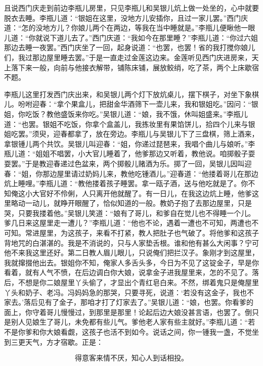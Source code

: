 且说西门庆走到前边李瓶儿房里，只见李瓶儿和吴银儿炕上做一处坐的，心中就要脱衣去睡。李瓶儿道：“银姐在这里，没地方儿安插你，且过一家儿罢。”西门庆道：“怎的没地方儿？你娘儿两个在两边，等我在当中睡就是。”李瓶儿便瞅他一眼儿道：“你就说下道儿去了。”西门庆道：“我如今在那里睡？”李瓶儿道：“你过六姐那边去睡一夜罢。”西门庆坐了一回，起身说道：“也罢，也罢！省的我打搅你娘儿们，我过那边屋里睡去罢。”于是一直走过金莲这边来。金莲听见西门庆进房来，天上落下来一般，向前与他接衣解带，铺陈床铺，展放鲛绡，吃了茶，两个上床歇宿不题。

李瓶儿这里打发西门庆出来，和吴银儿两个灯下放炕桌儿，摆下棋子，对坐下象棋儿。吩咐迎春：“拿个果盒儿，把甜金华酒筛下一壶儿来，我和银姐吃。”因问：“银姐，你吃饭？教他盛饭来你吃。”吴银儿道：“娘，我不饿，休叫姐盛来。”李瓶儿道：“也罢。银姐不吃饭，你拿个盒盖儿，我拣妆里有果馅饼儿，拾四个儿来与银姐吃罢。”须臾，迎春都拿了，放在旁边。李瓶儿与吴银儿下了三盘棋，筛上酒来，拿银锺儿两个共饮。吴银儿叫迎春：“姐，你递过琵琶来，我唱个曲儿与娘听。”李瓶儿道：“姐姐不唱罢，小大官儿睡着了，他爹那边又听着，教他说。咱掷骰子耍耍罢。”于是教迎春递过色盆来，两个掷骰儿赌酒为乐。掷了一回，吴银儿因叫迎春：“姐，你那边屋里请过奶妈儿来，教他吃锺酒儿。”迎春道：“他搂着哥儿在那边炕上睡哩。”李瓶儿道：“教他搂着孩子睡罢。拿一瓯子酒，送与他吃就是了。你不知俺这小大官好不伶俐，人只离开他就醒了。有一日儿，在我这边炕上睡，他爹这里略动一动儿，就睁开眼醒了，恰似知道的一般。教奶子抱了去那边屋里，只是哭，只要我搂着他。”吴银儿笑道：“娘有了哥儿，和爹自在觉儿也不得睡一个儿。爹几日来这屋里走一遭儿？”李瓶儿道：“他也不论，遇着一遭也不可知，两遭也不可知。常进屋里，为这孩子，来看不打紧，教人把肚子也气破了。将他爹和这孩子背地咒的白湛湛的。我是不消说的，只与人家垫舌根。谁和他有甚么大闲事？宁可他不来我这里还好。第二日教人眉儿眼儿，只说俺们把拦汉子。象刚才到这屋里，我就撺掇他出去。银姐你不知，俺家人多舌头多，今日为不见了这锭金子，早是你看着，就有人气不愤，在后边调白你大娘，说拿金子进我屋里来，怎的不见了。落后，不想是你二娘屋里丫头偷了，才显出个青红皂白来。不然，绑着鬼只是俺屋里丫头和奶子、老冯。冯妈妈急的那哭，只要寻死，说道：‘若没有这金子，我也不家去。’落后见有了金子，那咱才打了灯家去了。”吴银儿道：“娘，也罢。你看爹的面上，你守着哥儿慢慢过，到那里是那里！论起后边大娘没甚言语，也罢了。倒只是别人见娘生了哥儿，未免都有些儿气。爹他老人家有些主就好。”李瓶儿道：“若不是你爹和你大娘看觑，这孩子也活不到如今。说话之间，你一锺我一盏，不觉坐到三更天气，方才宿歇。正是：

\[
得意客来情不厌，知心人到话相投。
\]
